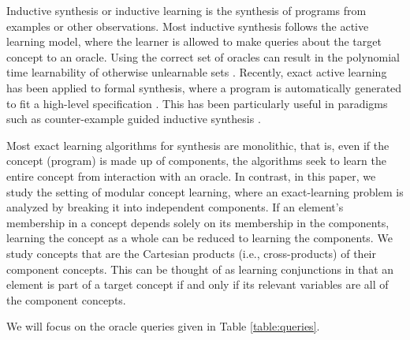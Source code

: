 
Inductive synthesis or inductive learning 
is the synthesis of programs from examples or other observations. 
Most inductive synthesis follows the active learning model, where the
learner is allowed to make queries about the target concept to an oracle. 
Using the correct set of oracles can result in the polynomial time learnability of otherwise unlearnable sets \cite{angluin1988queries}. 
Recently, exact active learning has been applied to formal synthesis, where a program is automatically generated to fit a high-level specification \cite{jha2017theory}. 
This has been particularly useful in paradigms such as 
counter-example guided inductive synthesis \cite{solar2006combinatorial}.

Most exact learning algorithms for synthesis are monolithic, that is, even
if the concept (program) is made up of components, the algorithms seek to
learn the entire concept from interaction with an oracle.
In contrast, in this paper, we study the setting of modular concept learning,
where an exact-learning problem is analyzed by breaking it into independent components. 
If an element's membership in a concept depends solely on its membership in the components, learning the concept as a whole can be reduced to learning the components. 
We study concepts that are the Cartesian products (i.e., cross-products) of their component concepts.  
This can be thought of as learning conjunctions in that an element is part of a target concept if and only if its relevant variables are all of the component concepts. 

We will focus on the oracle queries given in Table \ref{table:queries}.

